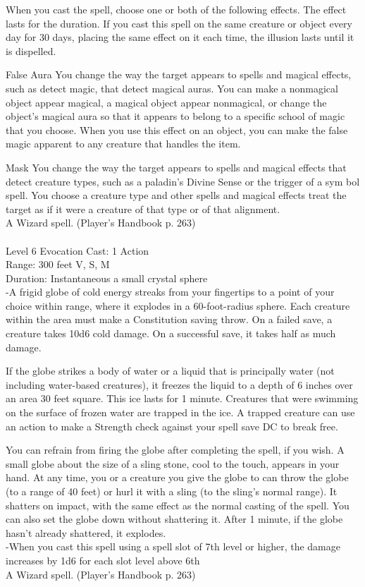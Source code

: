 \documentclass[10pt,twocolumn]{report}
\begin{document}
When you cast the spell, choose one or both of the following effects. The effect lasts for the duration. If you cast this spell on the same creature or object every day for 30 days, placing the same effect on it each time, the illusion lasts until it is dispelled. 

False Aura
You change the way the target appears to spells and magical effects, such as detect magic, that detect magical auras. You can make a nonmagical object appear magical, a magical object appear nonmagical, or change the object’s magical aura so that it appears to belong to a specific school of magic that you choose. When you use this effect on an object, you can make the false magic apparent to any creature that handles the item.

Mask
You change the way the target appears to spells and magical effects that detect creature types, such as a paladin’s Divine Sense or the trigger of a sym bol spell. You choose a creature type and other spells and magical effects treat the target as if it were a creature of that type or of that alignment.\\
A Wizard spell. (Player's Handbook p. 263) \\


 \\
Level 6 \quad Evocation \quad Cast: 1 Action\\
Range: 300 feet \quad V, S, M\\
Duration: Instantaneous \quad a small crystal sphere\\
-A frigid globe of cold energy streaks from your fingertips to a point of your choice within range, where it explodes in a 60-foot-radius sphere.
Each creature within the area must make a Constitution saving throw. On a failed save, a creature takes 10d6 cold damage. On a successful save, it takes half as much damage.

If the globe strikes a body of water or a liquid that is principally water (not including water-based creatures), it freezes the liquid to a depth of 6 inches over an area 30 feet square. This ice lasts for 1 minute. Creatures that were swimming on the surface of frozen water are trapped in the ice. A trapped creature can use an action to make a Strength check against your spell save DC to break free.

You can refrain from firing the globe after completing the spell, if you wish. A small globe about the size of a sling stone, cool to the touch, appears in your hand. At any time, you or a creature you give the globe to can throw the globe (to a range of 40 feet) or hurl it with a sling (to the sling’s normal range). It shatters on impact, with the same effect as the normal casting of the spell. You can also set the globe down without shattering it. After 1 minute, if the globe hasn’t already shattered, it explodes.\\
-When you cast this spell using a spell slot of 7th level or higher, the damage increases by 1d6 for each slot level above 6th\\
A Wizard spell. (Player's Handbook p. 263) \\
\end{document}

